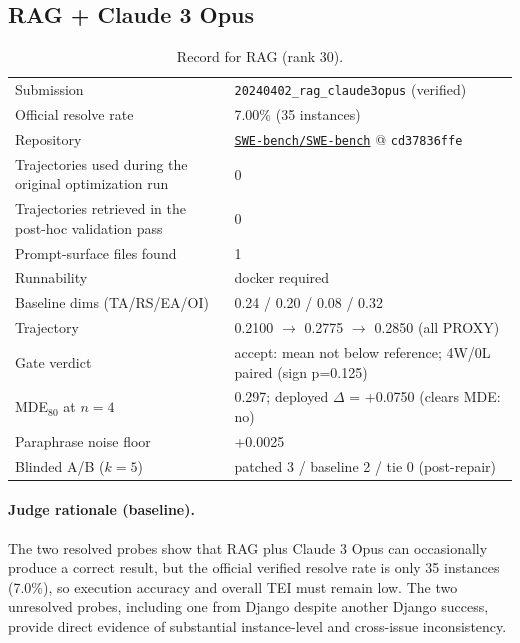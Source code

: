 \subsection{RAG + Claude 3 Opus}
\label{app:agent30}
\begin{table}[h]\centering\scriptsize
\caption{Record for RAG (rank 30).}
\begin{tabular}{lp{8.2cm}}\toprule
Submission & \texttt{20240402\_\allowbreak{}rag\_\allowbreak{}claude3opus} (verified) \\
Official resolve rate & 7.00\% (35 instances) \\
Repository & \href{https://github.com/SWE-bench/SWE-bench}{\texttt{SWE-bench/SWE-bench}} @ \texttt{cd37836ffe} \\
Trajectories used during the original optimization run & 0 \\
Trajectories retrieved in the post-hoc validation pass & 0 \\
Prompt-surface files found & 1 \\
Runnability & docker required \\
Baseline dims (TA/RS/EA/OI) & 0.24 / 0.20 / 0.08 / 0.32 \\
Trajectory & 0.2100 $\to$ 0.2775 $\to$ 0.2850 (all PROXY) \\
Gate verdict & accept: mean not below reference; 4W/0L paired (sign p=0.125) \\
MDE$_{80}$ at $n{=}4$ & 0.297; deployed $\Delta$ = +0.0750 (clears MDE: no) \\
Paraphrase noise floor & +0.0025 \\
Blinded A/B ($k{=}5$) & patched 3 / baseline 2 / tie 0 (post-repair) \\
\bottomrule\end{tabular}\end{table}
\paragraph{Judge rationale (baseline).}
The two resolved probes show that RAG plus Claude 3 Opus can occasionally produce a correct result, but the official verified resolve rate is only 35 instances (7.0\%), so execution accuracy and overall TEI must remain low. The two unresolved probes, including one from Django despite another Django success, provide direct evidence of substantial instance-level and cross-issue inconsistency.
